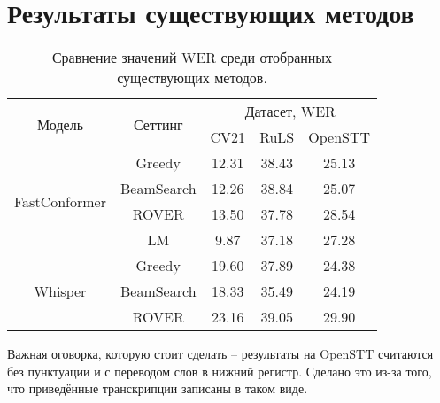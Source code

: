 \section{Результаты существующих методов}

\begin{table}[]
\centering
\caption{Сравнение значений WER среди отобранных существующих методов.}
\begin{tabular}{|c|c|ccc|}
\hline
\multirow{2}{*}{Модель}        & \multirow{2}{*}{Сеттинг}             & \multicolumn{3}{c|}{Датасет, WER}                                    \\ \cline{3-5} 
                               &                                      & \multicolumn{1}{c|}{CV21}  & \multicolumn{1}{c|}{RuLS}     & OpenSTT \\ \hline
\multirow{4}{*}{FastConformer} & Greedy                               & \multicolumn{1}{c|}{12.31} & \multicolumn{1}{c|}{38.43}    & 25.13   \\ \cline{2-5} 
                               & BeamSearch                           & \multicolumn{1}{c|}{12.26} & \multicolumn{1}{c|}{38.84}    & 25.07   \\ \cline{2-5}
                               & ROVER                                & \multicolumn{1}{c|}{13.50} & \multicolumn{1}{c|}{37.78}    & 28.54   \\ \cline{2-5}
                               & LM                                   & \multicolumn{1}{c|}{9.87}  & \multicolumn{1}{c|}{37.18}    & 27.28   \\ \hline 
\multirow{3}{*}{Whisper}       & Greedy                               & \multicolumn{1}{c|}{19.60} & \multicolumn{1}{c|}{37.89}    & 24.38   \\ \cline{2-5} 
                               & BeamSearch                           & \multicolumn{1}{c|}{18.33} & \multicolumn{1}{c|}{35.49}    & 24.19   \\ \cline{2-5}
                               & ROVER                                & \multicolumn{1}{c|}{23.16} & \multicolumn{1}{c|}{39.05}    & 29.90   \\ \hline
                               
\end{tabular}
\label{tab:res_base}
\end{table}

Важная оговорка, которую стоит сделать -- результаты на OpenSTT считаются без пунктуации и с переводом слов в нижний регистр.
Сделано это из-за того, что приведённые транскрипции записаны в таком виде.

